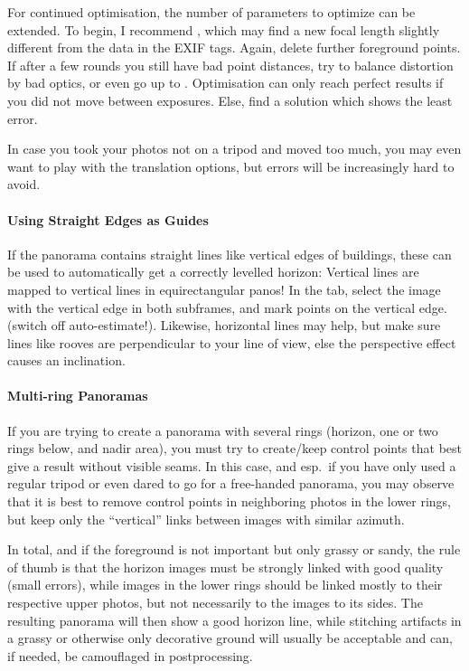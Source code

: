 For continued optimisation, the number of parameters to optimize can
be extended. To begin, I recommend , which may find a new focal length slightly different from
the data in the EXIF tags. Again, delete further foreground points. If
after a few rounds you still have bad point distances, try
 to balance
distortion by bad optics, or even go up to .  Optimisation can only reach perfect results if you
did not move between exposures. Else, find a solution which shows the
least error.

In case you took your photos not on a tripod and moved too much, you
may even want to play with the translation options, but errors will be
increasingly hard to avoid.

\paragraph{Using Straight Edges as Guides}
If the panorama contains straight lines like vertical edges of
buildings, these can be used to automatically get a correctly levelled
horizon: Vertical lines are mapped to vertical lines in
equirectangular panos! In the  tab, select the image
with the vertical edge in both subframes, and mark points on the
vertical edge. (switch off auto-estimate!).
Likewise, horizontal lines may help, but make sure lines like rooves
are perpendicular to your line of view, else the perspective effect
causes an inclination.

\paragraph{Multi-ring Panoramas}
If you are trying to create a panorama with several rings (horizon,
one or two rings below, and nadir area), you must try to create/keep control
points that best give a result without visible seams. In this case,
and esp.\ if you have only used a regular tripod or even dared to go
for a free-handed panorama, you may observe that it is best to remove
control points in neighboring photos in the lower rings, but keep only
the ``vertical'' links between images with similar azimuth.

In total, and if the foreground is not important but only grassy or
sandy, the rule of thumb is that the horizon images must be strongly
linked with good quality (small errors), while images in the lower
rings should be linked mostly to their respective upper photos, but
not necessarily to the  images to its sides. The resulting panorama will then
show a good horizon line, while stitching artifacts in a grassy or
otherwise only decorative ground will usually be acceptable and can,
if needed, be camouflaged in postprocessing.

